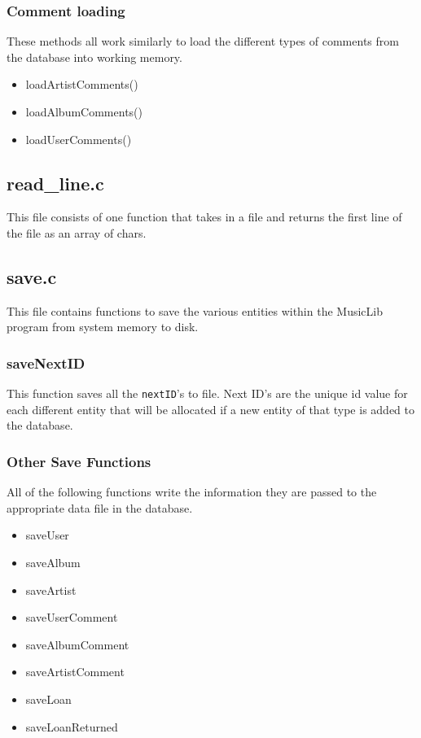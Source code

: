 \documentclass{article}
\begin{document}
\subsubsection*{Comment loading}
These methods all work similarly to load the different types of comments from the database into working memory.
\begin{itemize}
\item{loadArtistComments()}
\item{loadAlbumComments()}
\item{loadUserComments()}
\end{itemize}

\subsection{read\_line.c}
This file consists of one function that takes in a file and returns the first line of the file as an array of chars.

\subsection{save.c}
This file contains functions to save the various entities within the MusicLib program from system memory to disk.

\subsubsection*{saveNextID}
This function saves all the \verb|nextID|'s to file. Next ID's are the unique id value for each different entity that will be allocated if a new entity of that type is added to the database.

\subsubsection*{Other Save Functions}
All of the following functions write the information they are passed to the appropriate data file in the database.
\begin{itemize}
\item{saveUser}
\item{saveAlbum}
\item{saveArtist}
\item{saveUserComment}
\item{saveAlbumComment}
\item{saveArtistComment}
\item{saveLoan}
\item{saveLoanReturned}
\end{itemize}
\end{document}
